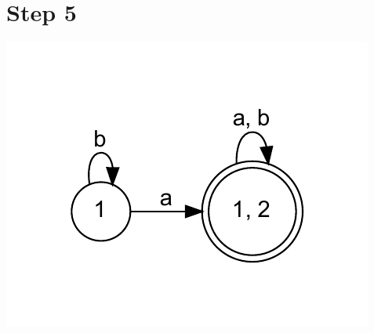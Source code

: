\documentclass{article}
\begin{document}
\section{Step 5}
\begin{center}
\includegraphics[width=\textwidth]{step4.dot.pdf}
\end{center}
\end{document}

